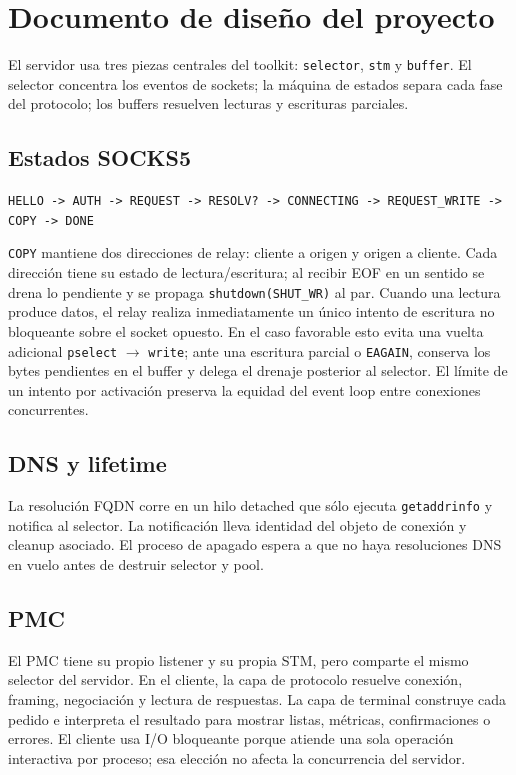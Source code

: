 \section{Documento de diseño del proyecto}

El servidor usa tres piezas centrales del toolkit: \texttt{selector},
\texttt{stm} y \texttt{buffer}. El selector concentra los eventos de sockets; la
máquina de estados separa cada fase del protocolo; los buffers resuelven
lecturas y escrituras parciales.

\subsection{Estados SOCKS5}

\begin{center}
\texttt{HELLO -> AUTH -> REQUEST -> RESOLV? -> CONNECTING -> REQUEST\_WRITE -> COPY -> DONE}
\end{center}

\texttt{COPY} mantiene dos direcciones de relay: cliente a origen y origen a
cliente. Cada dirección tiene su estado de lectura/escritura; al recibir EOF en
un sentido se drena lo pendiente y se propaga \texttt{shutdown(SHUT\_WR)} al par.
Cuando una lectura produce datos, el relay realiza inmediatamente un único
intento de escritura no bloqueante sobre el socket opuesto. En el caso favorable
esto evita una vuelta adicional \texttt{pselect} $\rightarrow$ \texttt{write}; ante una escritura
parcial o \texttt{EAGAIN}, conserva los bytes pendientes en el buffer y delega el
drenaje posterior al selector. El límite de un intento por activación preserva la
equidad del event loop entre conexiones concurrentes.

\subsection{DNS y lifetime}

La resolución FQDN corre en un hilo detached que sólo ejecuta \texttt{getaddrinfo}
y notifica al selector. La notificación lleva identidad del objeto de conexión y
cleanup asociado. El proceso de apagado espera a que no haya resoluciones DNS en
vuelo antes de destruir selector y pool.

\subsection{PMC}

El PMC tiene su propio listener y su propia STM, pero comparte el mismo selector
del servidor. En el cliente, la capa de protocolo resuelve conexión, framing,
negociación y lectura de respuestas. La capa de terminal construye cada pedido e
interpreta el resultado para mostrar listas, métricas, confirmaciones o errores.
El cliente usa I/O bloqueante porque atiende una sola operación interactiva por
proceso; esa elección no afecta la concurrencia del servidor.
